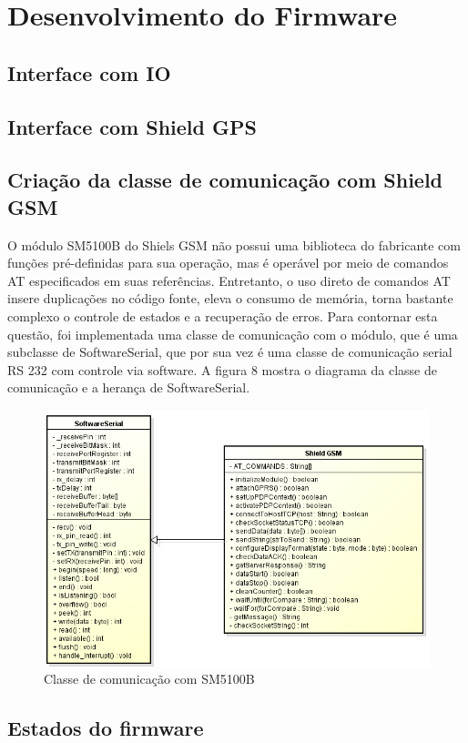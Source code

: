 \section {Desenvolvimento do Firmware}

\subsection{Interface com IO}

\subsection{Interface com Shield GPS}

\subsection{Criação da classe de comunicação com Shield GSM}
O módulo SM5100B do Shiels GSM não possui uma biblioteca do fabricante com funções pré-definidas para sua 
operação, mas é operável por meio de comandos AT especificados em suas referências. Entretanto,
o uso direto de comandos AT insere duplicações no código fonte, eleva o consumo de memória,
torna bastante complexo o controle de estados e a recuperação de erros. Para contornar esta questão,
foi implementada uma classe de comunicação com o módulo, que é uma subclasse de SoftwareSerial, que por
sua vez é uma classe de comunicação serial RS 232 com controle via software. A figura 8 mostra o diagrama
da classe de comunicação e a herança de SoftwareSerial.

\begin{figure}[!htb]
	\centering
	\includegraphics[width=9.00cm\textwidth]{figures/lib_gsm.png}
	\caption{Classe de comunicação com SM5100B}
	\label{Figura 8}
\end{figure}

\subsection{Estados do firmware}

